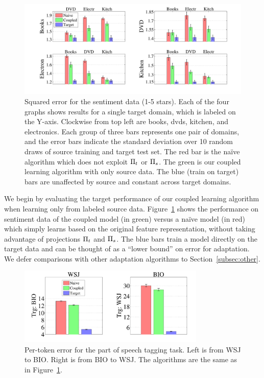 \begin{figure}
\hspace{-0.5in}
\includegraphics[width=6.4in]{figures/sentiment.pdf}
\vspace{-0.3in}
\caption{Squared error for the sentiment data (1-5 stars).  Each of
  the four graphs shows results for a single target domain, which is
  labeled on the Y-axis.  Clockwise from top left are books, dvds,
  kitchen, and electronics.  Each group of three bars represents one
  pair of domains, and the error bars indicate the standard deviation
  over 10 random draws of source training and target test set.  The
  red bar is the na\"{i}ve algorithm which does not exploit $\Pi_t$
  or $\Pi_s$.  The green is our coupled learning algorithm with only
  source data.  The blue (train on target) bars are unaffected by
  source and constant across target domains.}
\label{fig:sentiment_results}
\end{figure}

We begin by evaluating the target performance of our coupled learning
algorithm when learning only from labeled source data.
Figure~\ref{fig:sentiment_results} shows the performance on sentiment
data of the coupled model (in green) versus a na\"{i}ve model (in red)
which simply learns based on the original feature representation,
without taking advantage of projections $\Pi_t$ and $\Pi_s$.  The
blue bars train a model directly on the target data and can be thought
of as a ``lower bound'' on error for adaptation.  We defer comparisons
with other adaptation algorithms to Section~\ref{subsec:other}.

\begin{figure}
\includegraphics[width=3.5in]{figures/pos.pdf}
\caption{Per-token error for the part of speech tagging task.  Left is from WSJ to BIO.  Right is from BIO to WSJ.  The algorithms are the same as in Figure~\ref{fig:sentiment_results}.}
\label{fig:pos_results}
\end{figure}

